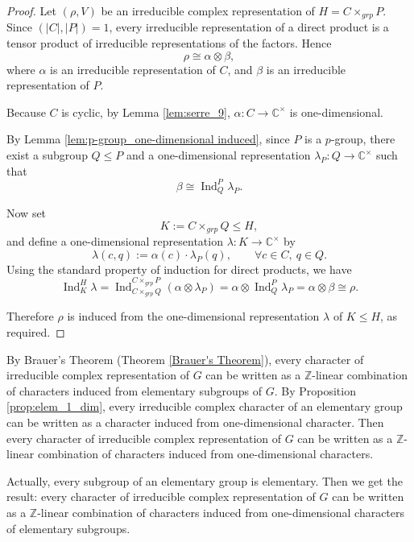 \begin{proof}
Let \((\rho, V)\) be an irreducible complex representation of \(H = C \times_{grp} P\). Since \((|C|, |P|) = 1\), every irreducible representation of a direct product is a tensor product of irreducible representations of the factors. Hence
\[
\rho \cong \alpha \otimes \beta,
\]
where \(\alpha\) is an irreducible representation of \(C\), and \(\beta\) is an irreducible representation of \(P\).

Because \(C\) is cyclic, by Lemma \ref{lem:serre_9}, \(\alpha: C \to \mathbb{C}^{\times}\) is one-dimensional.

By Lemma \ref{lem:p-group_one-dimensional induced}, since \(P\) is a \(p\)-group, there exist a subgroup \(Q \le P\) and a one-dimensional representation \(\lambda_P: Q \to \mathbb{C}^{\times}\) such that
\[
\beta \cong \operatorname{Ind}_{Q}^{P} \lambda_P.
\]

Now set
\[
K := C \times_{grp} Q \le H,
\]
and define a one-dimensional representation \(\lambda: K \to \mathbb{C}^{\times}\) by
\[
\lambda(c, q) := \alpha(c) \cdot \lambda_P(q), \qquad \forall c \in C,\ q \in Q.
\]
Using the standard property of induction for direct products, we have
\[
\operatorname{Ind}_{K}^{H} \lambda
= \operatorname{Ind}_{C \times_{grp} Q}^{C \times_{grp} P} (\alpha \otimes \lambda_P)
= \alpha \otimes \operatorname{Ind}_{Q}^{P} \lambda_P
= \alpha \otimes \beta
\cong \rho.
\]

Therefore \(\rho\) is induced from the one-dimensional representation \(\lambda\) of \(K \le H\), as required.
\end{proof}

\begin{remark}\label{rem:Strong_Brauer}
By Brauer’s Theorem (Theorem \ref{Brauer's Theorem}), every character of irreducible
complex representation of $G$  can be  written as a $\mathbb{Z} $-linear combination of characters induced from elementary subgroups of $G$. By Proposition \ref{prop:elem_1_dim}, every irreducible complex character of an elementary group can be  written as  a character induced from one-dimensional character. Then every character of irreducible
complex representation of $G$ can be  written as a $\mathbb{Z} $-linear combination of characters induced from one-dimensional characters.

Actually, every subgroup of an elementary group is elementary. Then we get the result: every character of irreducible
complex representation of $G$ can be  written as a $\mathbb{Z} $-linear combination of characters induced from one-dimensional characters of elementary subgroups. 
\end{remark}

